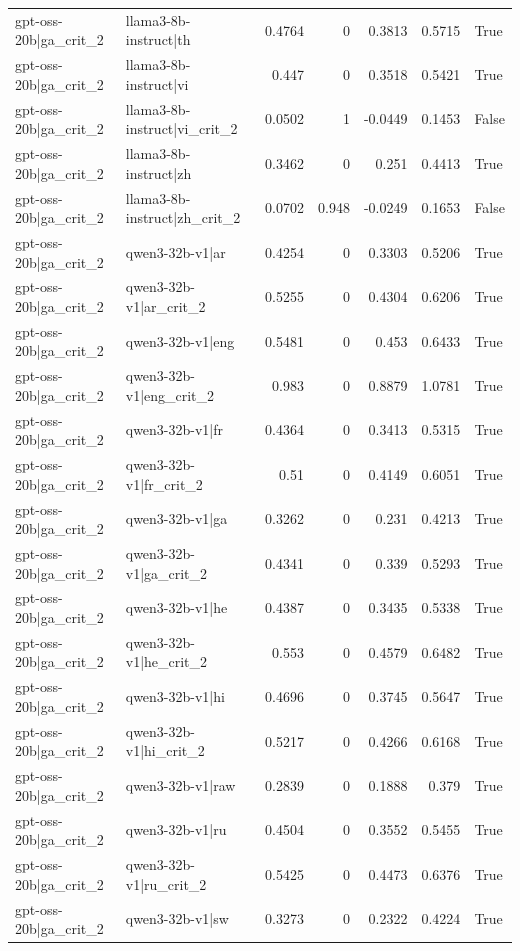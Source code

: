 \begin{table}
\begin{tabular}{l l r r r r l}
gpt-oss-20b|ga_crit_2 & llama3-8b-instruct|th & 0.4764 & 0 & 0.3813 & 0.5715 & True \\
gpt-oss-20b|ga_crit_2 & llama3-8b-instruct|vi & 0.447 & 0 & 0.3518 & 0.5421 & True \\
gpt-oss-20b|ga_crit_2 & llama3-8b-instruct|vi_crit_2 & 0.0502 & 1 & -0.0449 & 0.1453 & False \\
gpt-oss-20b|ga_crit_2 & llama3-8b-instruct|zh & 0.3462 & 0 & 0.251 & 0.4413 & True \\
gpt-oss-20b|ga_crit_2 & llama3-8b-instruct|zh_crit_2 & 0.0702 & 0.948 & -0.0249 & 0.1653 & False \\
gpt-oss-20b|ga_crit_2 & qwen3-32b-v1|ar & 0.4254 & 0 & 0.3303 & 0.5206 & True \\
gpt-oss-20b|ga_crit_2 & qwen3-32b-v1|ar_crit_2 & 0.5255 & 0 & 0.4304 & 0.6206 & True \\
gpt-oss-20b|ga_crit_2 & qwen3-32b-v1|eng & 0.5481 & 0 & 0.453 & 0.6433 & True \\
gpt-oss-20b|ga_crit_2 & qwen3-32b-v1|eng_crit_2 & 0.983 & 0 & 0.8879 & 1.0781 & True \\
gpt-oss-20b|ga_crit_2 & qwen3-32b-v1|fr & 0.4364 & 0 & 0.3413 & 0.5315 & True \\
gpt-oss-20b|ga_crit_2 & qwen3-32b-v1|fr_crit_2 & 0.51 & 0 & 0.4149 & 0.6051 & True \\
gpt-oss-20b|ga_crit_2 & qwen3-32b-v1|ga & 0.3262 & 0 & 0.231 & 0.4213 & True \\
gpt-oss-20b|ga_crit_2 & qwen3-32b-v1|ga_crit_2 & 0.4341 & 0 & 0.339 & 0.5293 & True \\
gpt-oss-20b|ga_crit_2 & qwen3-32b-v1|he & 0.4387 & 0 & 0.3435 & 0.5338 & True \\
gpt-oss-20b|ga_crit_2 & qwen3-32b-v1|he_crit_2 & 0.553 & 0 & 0.4579 & 0.6482 & True \\
gpt-oss-20b|ga_crit_2 & qwen3-32b-v1|hi & 0.4696 & 0 & 0.3745 & 0.5647 & True \\
gpt-oss-20b|ga_crit_2 & qwen3-32b-v1|hi_crit_2 & 0.5217 & 0 & 0.4266 & 0.6168 & True \\
gpt-oss-20b|ga_crit_2 & qwen3-32b-v1|raw & 0.2839 & 0 & 0.1888 & 0.379 & True \\
gpt-oss-20b|ga_crit_2 & qwen3-32b-v1|ru & 0.4504 & 0 & 0.3552 & 0.5455 & True \\
gpt-oss-20b|ga_crit_2 & qwen3-32b-v1|ru_crit_2 & 0.5425 & 0 & 0.4473 & 0.6376 & True \\
gpt-oss-20b|ga_crit_2 & qwen3-32b-v1|sw & 0.3273 & 0 & 0.2322 & 0.4224 & True \\

\end{tabular}
\end{table}

